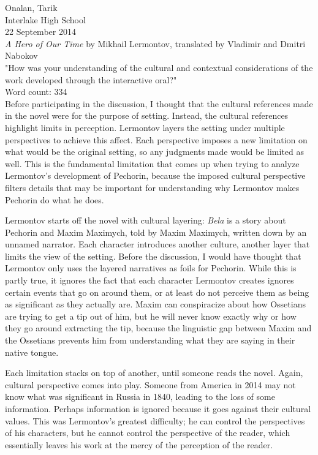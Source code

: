 \documentclass[a4paper]{article}
\begin{document}
    \noindent{}Onalan, Tarik \\
    Interlake High School \\
    22 September 2014 \\

    \noindent\textit{A Hero of Our Time} by Mikhail Lermontov, translated by Vladimir and Dmitri Nabokov \\

    \noindent"How was your understanding of the cultural and contextual considerations of
    the work developed through the interactive oral?" \\

    \noindent{}Word count: 334\\

    Before participating in the discussion, I thought that the cultural references
    made in the novel were for the purpose of setting. Instead, the cultural references
    highlight limits in perception. Lermontov layers the setting under multiple
    perspectives to achieve this affect. Each perspective imposes a new limitation
    on what would be the original setting, so any judgments made would be limited
    as well. This is the fundamental limitation that comes up when trying to analyze
    Lermontov's development of Pechorin, because the imposed cultural perspective
    filters details that may be important for understanding why Lermontov makes
    Pechorin do what he does.

    Lermontov starts off the novel with cultural layering: \textit{Bela} is a story
    about Pechorin and Maxim Maximych, told by Maxim Maximych, written down by an
    unnamed narrator. Each character introduces another culture, another layer
    that limits the view of the setting. Before the discussion, I would have thought
    that Lermontov only uses the layered narratives as foils for Pechorin. While
    this is partly true, it ignores the fact that each character Lermontov creates
    ignores certain events that go on around them, or at least do not perceive them
    as being as significant as they actually are. Maxim can conspiracize about how
    Ossetians are trying to get a tip out of him, but he will never know exactly
    why or how they go around extracting the tip, because the linguistic gap between
    Maxim and the Ossetians prevents him from understanding what they are saying in
    their native tongue.

    Each limitation stacks on top of another, until someone reads the novel. Again,
    cultural perspective comes into play. Someone from America in 2014 may not
    know what was significant in Russia in 1840, leading to the loss of some information.
    Perhaps information is ignored because it goes against their cultural values.
    This was Lermontov's greatest difficulty; he can control the perspectives of
    his characters, but he cannot control the perspective of the reader, which
    essentially leaves his work at the mercy of the perception of the reader.
\end{document}

